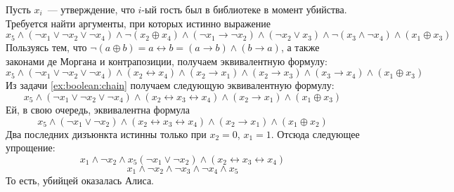 \begin{Answer}
    \noindent
    Пусть $ x_i $~--- утверждение, что $ i $-ый гость был в библиотеке в момент убийства.
    Требуется найти аргументы, при которых истинно выражение
    \[
        x_5 \wedge (\neg x_1 \vee \neg x_2 \vee \neg x_4 ) \wedge \neg (x_2 \oplus x_4) \wedge
        (\neg x_1 \rightarrow \neg x_2) \wedge (\neg x_2 \vee x_3) \wedge \neg (x_3 \wedge \neg x_4) \wedge (x_1 \oplus x_3)
    \]
    Пользуясь тем, что $ \neg (a \oplus b) = a \leftrightarrow b = (a \rightarrow b) \wedge (b \rightarrow a) $, а также законами де Моргана и контрапозиции,
    получаем эквивалентную формулу:
    \[
        x_5 \wedge (\neg x_1 \vee \neg x_2 \vee \neg x_4 ) \wedge (x_2 \leftrightarrow x_4) \wedge (x_2 \rightarrow x_1) \wedge (x_2 \rightarrow x_3) \wedge
        (x_3 \rightarrow x_4) \wedge (x_1 \oplus x_3)
    \]
    Из задачи \ref{ex:boolean:chain} получаем следующую эквивалентную формулу:
    \[
        x_5 \wedge (\neg x_1 \vee \neg x_2 \vee \neg x_4 ) \wedge (x_2 \leftrightarrow x_3 \leftrightarrow x_4) \wedge (x_2 \rightarrow x_1) \wedge (x_1 \oplus x_3)
    \]
    Ей, в свою очередь, эквивалентна формула
    \[
        x_5 \wedge (\neg x_1 \vee \neg x_2 ) \wedge (x_2 \leftrightarrow x_3 \leftrightarrow x_4) \wedge (x_2 \rightarrow x_1) \wedge (x_1 \oplus x_2)
    \]
    Два последних дизъюнкта истинны только при $ x_2 = 0 $, $ x_1 = 1 $.
    Отсюда следующее упрощение:
    \[
        x_1 \wedge \neg x_2 \wedge x_5 (\neg x_1 \vee \neg x_2 ) \wedge (x_2 \leftrightarrow x_3 \leftrightarrow x_4)
    \]
    \[
        x_1 \wedge \neg x_2 \wedge \neg x_3 \wedge \neg x_4 \wedge x_5
    \]
    То есть, убийцей оказалась Алиса.
\end{Answer}


%
